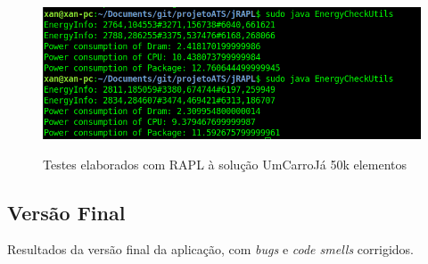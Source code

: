 \begin{itemize}
        \begin{figure}[H]
            \hbox{\hspace{-8em} \includegraphics[width=1.4\textwidth]{images/rapl_50k_v1.png}}
            \label{fig55}
            \caption{Testes elaborados com RAPL à solução UmCarroJá 50k elementos}
        \end{figure}
        

\end{itemize}

\hfill\newline
\hfill\newline
\subsection{Versão Final}\hfill
\newline
\par Resultados da versão final da aplicação, com \textit{bugs} e \textit{code smells} corrigidos.\newpage

